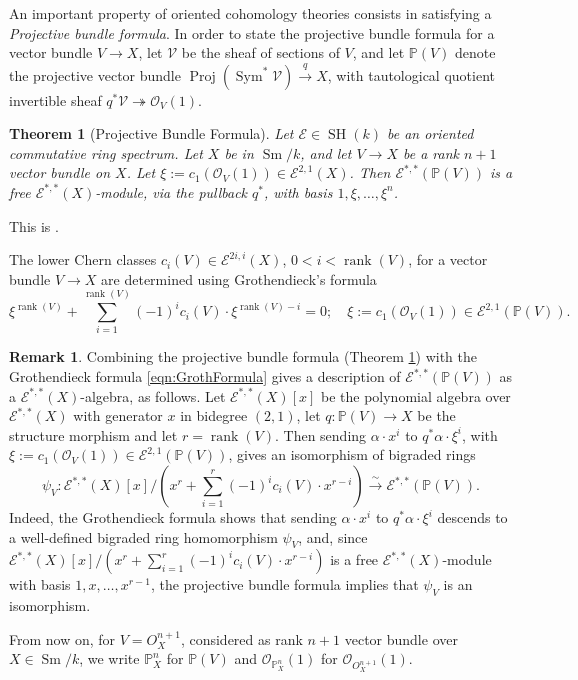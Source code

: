 \documentclass[10pt]{amsart}
\theoremstyle{definition}
\newtheorem{rmk}[defn]{Remark}
\theoremstyle{plain}
\newtheorem{thm}[defn]{Theorem}
\numberwithin{equation}{section}
\newcommand{\0}{\emptyset}
\newcommand{\sE}{{\mathcal E}}
\newcommand{\sO}{{\mathcal O}}
\newcommand{\sV}{{\mathcal V}}
\renewcommand{\P}{{\mathbb P}}
\newcommand{\SH}{{\operatorname{SH}}}
\newcommand{\Sm}{{\operatorname{Sm}}}
\newcommand{\rnk}{{\operatorname{rank}}}
\newcommand{\Sym}{{\operatorname{Sym}}}
\begin{document}
An important property of oriented cohomology theories consists in satisfying a \emph{Projective bundle formula}. In order to state the projective bundle formula for a vector bundle $V\to X$, let $\sV$ be the sheaf of sections of $V$, and let $\P(V)$ denote the projective vector bundle $\operatorname{Proj}(\Sym^*\sV)\xrightarrow{q}X$, with tautological quotient invertible sheaf $q^*\sV\twoheadrightarrow\sO_V(1)$.

\begin{thm}[Projective Bundle Formula]\label{thm:PBF} Let $\sE\in \SH(k)$ be an oriented commutative ring spectrum. Let $X$ be in $\Sm/k$, and let $V\to X$ be a rank $n+1$ vector bundle on $X$. Let $\xi:=c_1(\sO_V(1))\in \sE^{2,1}(X)$. Then $\sE^{*,*}(\P(V))$ is a free $\sE^{*,*}(X)$-module, via the pullback $q^*$, with basis $1, \xi,\ldots, \xi^n$.
\end{thm}
This is \cite[Theorem 3.9]{Pan:oriented}.

The lower Chern classes $c_i(V)\in \sE^{2i,i}(X)$, $0<i<{\rnk(V)}$, for a vector bundle $V\to X$ are determined using Grothendieck's formula
\begin{equation}\label{eqn:GrothFormula}
\xi^{\rnk(V)}+\sum_{i=1}^{\rnk(V)}(-1)^ic_i(V)\cdot \xi^{\rnk(V)-i}=0;\quad \xi:=c_1(\sO_V(1))\in \sE^{2,1}(\P(V)).
\end{equation}

\begin{rmk}\label{rem:PBFAlgebra} Combining the projective bundle formula (Theorem \ref{thm:PBF}) with the Grothendieck formula \eqref{eqn:GrothFormula} gives a description of $\sE^{*,*}(\P(V))$ as a $\sE^{*,*}(X)$-algebra, as follows. Let $\sE^{*,*}(X)[x]$ be the polynomial algebra over $\sE^{*,*}(X)$ with generator $x$ in bidegree $(2,1)$, let $q:\P(V)\to X$ be the structure morphism and let $r=\rnk(V)$. Then sending $\alpha\cdot x^i$ to  $q^*\alpha\cdot \xi^i$, with $\xi:=c_1(\sO_V(1))\in \sE^{2,1}(\P(V))$, gives an isomorphism of bigraded rings
\[
\psi_V:\sE^{*,*}(X)[x]/(x^r+\sum_{i=1}^r(-1)^ic_i(V)\cdot x^{r-i})\xrightarrow{\sim} \sE^{*,*}(\P(V)).
\]
Indeed, the Grothendieck formula shows that sending $\alpha\cdot x^i$ to $q^*\alpha\cdot \xi^i$ descends to a well-defined bigraded ring homomorphism $\psi_V$, and, since $\sE^{*,*}(X)[x]/(x^{r}+\sum_{i=1}^{r}(-1)^ic_i(V)\cdot x^{r-i})$ is a free $\sE^{*,*}(X)$-module with basis $1, x,\ldots, x^{r-1}$, the  projective bundle formula implies that $\psi_V$ is an isomorphism.
\end{rmk}

From now on, for $V=O_X^{n+1}$, considered as rank $n+1$ vector bundle over $X\in \Sm/k$, we write $\P^n_X$ for $\P(V)$ and $\sO_{\P^n_X}(1)$ for $\sO_{O_X^{n+1}}(1)$.
\end{document}
